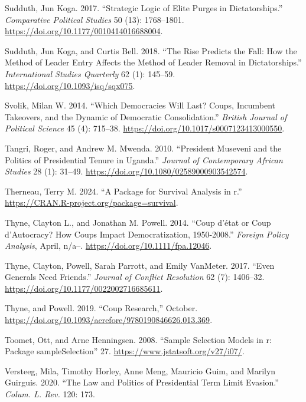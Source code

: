 \documentclass[
  12pt,
]{report}
\newlength{\cslhangindent}
\newenvironment{CSLReferences}[2] %
 {\begin{list}{}{%
  \setlength{\itemindent}{0pt}
  \setlength{\leftmargin}{0pt}
  \setlength{\parsep}{0pt}
  \ifodd #1
   \setlength{\leftmargin}{\cslhangindent}
   \setlength{\itemindent}{-1\cslhangindent}
  \fi
  \setlength{\itemsep}{#2\baselineskip}}}
 {\end{list}}
\begin{document}
\begin{CSLReferences}{1}{0}
Sudduth, Jun Koga. 2017. {``Strategic Logic of Elite Purges in
Dictatorships.''} \emph{Comparative Political Studies} 50 (13):
1768--1801. \url{https://doi.org/10.1177/0010414016688004}.

Sudduth, Jun Koga, and Curtis Bell. 2018. {``The Rise Predicts the Fall:
How the Method of Leader Entry Affects the Method of Leader Removal in
Dictatorships.''} \emph{International Studies Quarterly} 62 (1):
145--59. \url{https://doi.org/10.1093/isq/sqx075}.

Svolik, Milan W. 2014. {``Which Democracies Will Last? Coups, Incumbent
Takeovers, and the Dynamic of Democratic Consolidation.''} \emph{British
Journal of Political Science} 45 (4): 715--38.
\url{https://doi.org/10.1017/s0007123413000550}.

Tangri, Roger, and Andrew M. Mwenda. 2010. {``President Museveni and the
Politics of Presidential Tenure in Uganda.''} \emph{Journal of
Contemporary African Studies} 28 (1): 31--49.
\url{https://doi.org/10.1080/02589000903542574}.

Therneau, Terry M. 2024. {``A Package for Survival Analysis in r.''}
\url{https://CRAN.R-project.org/package=survival}.

Thyne, Clayton L., and Jonathan M. Powell. 2014. {``Coup d{'}état or
Coup d'Autocracy? How Coups Impact Democratization, 1950-2008.''}
\emph{Foreign Policy Analysis}, April, n/a--.
\url{https://doi.org/10.1111/fpa.12046}.

Thyne, Clayton, Powell, Sarah Parrott, and Emily VanMeter. 2017. {``Even
Generals Need Friends.''} \emph{Journal of Conflict Resolution} 62 (7):
1406--32. \url{https://doi.org/10.1177/0022002716685611}.

Thyne, and Powell. 2019. {``Coup Research,''} October.
\url{https://doi.org/10.1093/acrefore/9780190846626.013.369}.

Toomet, Ott, and Arne Henningsen. 2008. {``Sample Selection Models in
{\textbraceleft}r{\textbraceright}: Package
{\textbraceleft}sampleSelection{\textbraceright}''} 27.
\url{https://www.jstatsoft.org/v27/i07/}.

Versteeg, Mila, Timothy Horley, Anne Meng, Mauricio Guim, and Marilyn
Guirguis. 2020. {``The Law and Politics of Presidential Term Limit
Evasion.''} \emph{Colum. L. Rev.} 120: 173.


\end{CSLReferences}
\end{document}
